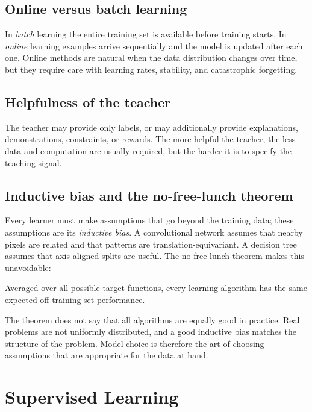 \documentclass[a4paper, 12pt]{book}
\begin{document}
\section{Online versus batch learning}

In \emph{batch} learning the entire training set is available before training starts.
In \emph{online} learning examples arrive sequentially and the model is updated after
each one. Online methods are natural when the data distribution changes over time,
but they require care with learning rates, stability, and catastrophic forgetting.

\section{Helpfulness of the teacher}

The teacher may provide only labels, or may additionally provide explanations,
demonstrations, constraints, or rewards. The more helpful the teacher, the less data
and computation are usually required, but the harder it is to specify the teaching
signal.

\section{Inductive bias and the no-free-lunch theorem}

Every learner must make assumptions that go beyond the training data; these
assumptions are its \emph{inductive bias}. A convolutional network assumes that
nearby pixels are related and that patterns are translation-equivariant. A decision
tree assumes that axis-aligned splits are useful. The no-free-lunch theorem makes
this unavoidable:

\begin{theorem}
Averaged over all possible target functions, every learning algorithm has the same
expected off-training-set performance.
\end{theorem}

The theorem does not say that all algorithms are equally good in practice. Real problems are not uniformly distributed, and a good inductive bias matches the structure of the problem. Model choice is therefore the art of choosing assumptions that are appropriate for the data at hand.

\chapter{Supervised Learning}
\label{ch:supervised}
\end{document}
